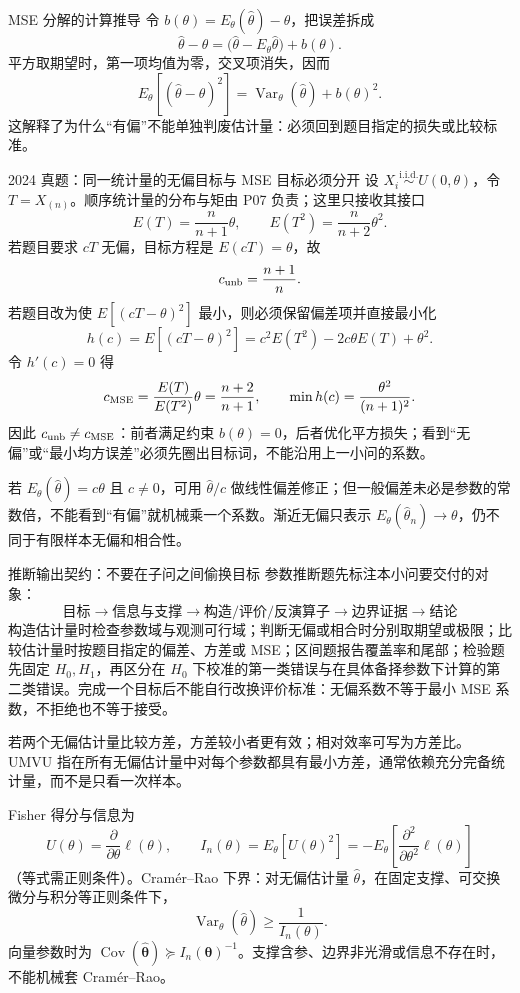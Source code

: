 \documentclass[11pt,a4paper]{ctexart}
\begin{document}
\begin{methodbox}{MSE 分解的计算推导}
令 $b(\theta)=E_\theta(\widehat\theta)-\theta$，把误差拆成
\[
\widehat\theta-\theta
=\bigl(\widehat\theta-E_\theta\widehat\theta\bigr)+b(\theta).
\]
平方取期望时，第一项均值为零，交叉项消失，因而
\[
E_\theta[(\widehat\theta-\theta)^2]
=\operatorname{Var}_\theta(\widehat\theta)+b(\theta)^2.
\]
这解释了为什么“有偏”不能单独判废估计量：必须回到题目指定的损失或比较标准。
\end{methodbox}

\begin{examplebox}{2024 真题：同一统计量的无偏目标与 MSE 目标必须分开}
设 $X_i\overset{\mathrm{i.i.d.}}\sim U(0,\theta)$，令 $T=X_{(n)}$。顺序统计量的分布与矩由 P07 负责；这里只接收其接口
\[
E(T)=\frac{n}{n+1}\theta,\qquad E(T^2)=\frac{n}{n+2}\theta^2.
\]
若题目要求 $cT$ 无偏，目标方程是 $E(cT)=\theta$，故
\[
c_{\rm unb}=\frac{n+1}{n}.
\]
若题目改为使 $E[(cT-\theta)^2]$ 最小，则必须保留偏差项并直接最小化
\[
h(c)=E[(cT-\theta)^2]
=c^2E(T^2)-2c\theta E(T)+\theta^2.
\]
令 $h'(c)=0$ 得
\[
c_{\rm MSE}=\frac{E(T)}{E(T^2)}\theta
=\frac{n+2}{n+1},\qquad
\min h(c)=\frac{\theta^2}{(n+1)^2}.
\]
因此 $c_{\rm unb}\ne c_{\rm MSE}$：前者满足约束 $b(\theta)=0$，后者优化平方损失；看到“无偏”或“最小均方误差”必须先圈出目标词，不能沿用上一小问的系数。
\end{examplebox}

若 $E_\theta(\widehat\theta)=c\theta$ 且 $c\ne0$，可用 $\widehat\theta/c$ 做线性偏差修正；但一般偏差未必是参数的常数倍，不能看到“有偏”就机械乘一个系数。渐近无偏只表示 $E_\theta(\widehat\theta_n)\to\theta$，仍不同于有限样本无偏和相合性。

\begin{methodbox}{推断输出契约：不要在子问之间偷换目标}
参数推断题先标注本小问要交付的对象：
\[
\boxed{\text{目标}\to\text{信息与支撑}\to\text{构造/评价/反演算子}\to\text{边界证据}\to\text{结论}}
\]
构造估计量时检查参数域与观测可行域；判断无偏或相合时分别取期望或极限；比较估计量时按题目指定的偏差、方差或 MSE；区间题报告覆盖率和尾部；检验题先固定 $H_0,H_1$，再区分在 $H_0$ 下校准的第一类错误与在具体备择参数下计算的第二类错误。完成一个目标后不能自行改换评价标准：无偏系数不等于最小 MSE 系数，不拒绝也不等于接受。
\end{methodbox}

若两个无偏估计量比较方差，方差较小者更有效；相对效率可写为方差比。UMVU 指在所有无偏估计量中对每个参数都具有最小方差，通常依赖充分完备统计量，而不是只看一次样本。

Fisher 得分与信息为
\[
U(\theta)=\frac{\partial}{\partial\theta}\ell(\theta),\qquad
I_n(\theta)=E_\theta[U(\theta)^2]
=-E_\theta\left[\frac{\partial^2}{\partial\theta^2}\ell(\theta)\right]
\]
（等式需正则条件）。Cramér--Rao 下界：对无偏估计量 $\widehat\theta$，在固定支撑、可交换微分与积分等正则条件下，
\[
\boxed{\operatorname{Var}_\theta(\widehat\theta)\geq\frac1{I_n(\theta)}}.
\]
向量参数时为 $\operatorname{Cov}(\widehat{\boldsymbol\theta})\succeq I_n(\boldsymbol\theta)^{-1}$。支撑含参、边界非光滑或信息不存在时，不能机械套 Cramér--Rao。
\end{document}
